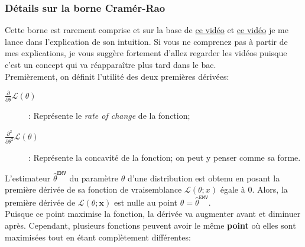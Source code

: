 \documentclass[10pt, french]{article}
\begin{document}
\begin{multicols*}{2}
\subsubsection*{Détails sur la borne Cramér-Rao}
Cette borne est rarement comprise et sur la base de \hyperlink{https://www.youtube.com/watch?v=igQIsYAlKlY}{\color{blue}ce vidéo} et \hyperlink{https://www.youtube.com/watch?v=i0JiSddCXMM}{\color{blue}ce vidéo} je me lance dans l'explication de son intuition. Si vous ne comprenez pas à partir de mes explications, je vous suggère fortement d'allez regarder les vidéos puisque c'est un concept qui va réapparaître plus tard dans le bac.\\

Premièrement, on définit l'utilité des deux premières dérivées:
\begin{description}
	\item[$\frac{\partial}{\partial\theta} \mathcal{L}(\theta)$]: Représente le \og \textit{rate of change}\fg{} de la fonction;
	\item[$\frac{\partial^{2}}{\partial\theta^{2}} \mathcal{L}(\theta)$]: Représente la concavité de la fonction; on peut y penser comme sa forme.
\end{description}

L'estimateur $\hat\theta^{\texttt{EMV}}$ du paramètre $\theta$ d'une distribution est obtenu en posant la première dérivée de sa fonction de vraisemblance $\mathcal{L}(\theta ; x)$ égale à 0. Alors, la première dérivée de $\mathcal{L}(\theta; \bm{x})$ est nulle au point $\theta = \hat\theta^{\texttt{EMV}}$. \\

Puisque ce point maximise la fonction, la dérivée va augmenter avant et diminuer après.
Cependant, plusieurs fonctions peuvent avoir le même \textbf{point} où elles sont maximisées tout en étant complètement différentes:


\begin{tikzpicture}[x=0.75pt,y=0.75pt,yscale=-1,xscale=1]


\end{tikzpicture}
\end{multicols*}
\end{document}
